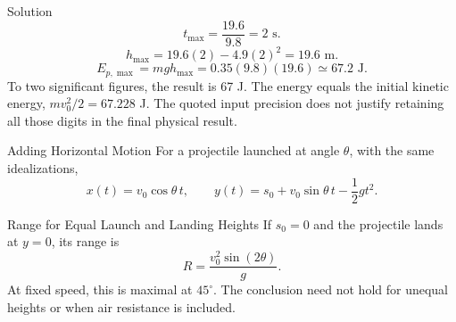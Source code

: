 \documentclass[10pt]{beamer}
\begin{document}
\begin{frame}{Solution}
\[
t_{\max}=\frac{19.6}{9.8}=2\text{ s}.
\]
\[
h_{\max}=19.6(2)-4.9(2)^2=19.6\text{ m}.
\]
\[
E_{p,\max}=mgh_{\max}=0.35(9.8)(19.6)\simeq67.2\text{ J}.
\]
To two significant figures, the result is 67 J. The energy equals the initial kinetic energy, \(mv_0^2/2=67.228\) J. The quoted input precision does not justify retaining all those digits in the final physical result.
\end{frame}
\begin{frame}{Adding Horizontal Motion}
For a projectile launched at angle \(\theta\), with the same idealizations,
\[
x(t)=v_0\cos\theta\,t,
\qquad y(t)=s_0+v_0\sin\theta\,t-\frac12gt^2.
\]
\begin{block}{Range for Equal Launch and Landing Heights}
If \(s_0=0\) and the projectile lands at \(y=0\), its range is
\[
R=\frac{v_0^2\sin(2\theta)}g.
\]
At fixed speed, this is maximal at \(45^\circ\). The conclusion need not hold for unequal heights or when air resistance is included.
\end{block}
\end{frame}
\end{document}
